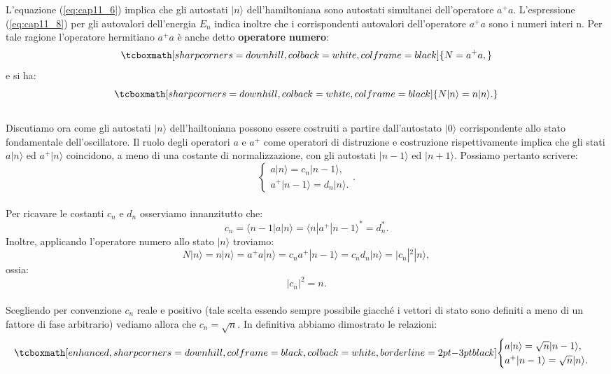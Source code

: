  L'equazione (\ref{eq:cap11_6}) implica che gli autostati $|n\rangle$ dell'hamiltoniana sono autostati simultanei dell'operatore $a^+a$. L'espressione (\ref{eq:cap11_8}) per gli autovalori dell'energia $E_n$ indica inoltre che i corrispondenti autovalori dell'operatore $a^+a$ sono i numeri interi n. Per tale ragione l'operatore hermitiano $a^+a$ è anche detto \textbf{operatore numero}:
	\begin{equation}
		\tcboxmath[sharp corners=downhill, colback=white, colframe=black]{
			N=a^+a,
			}
	\end{equation}
e si ha:
	\begin{equation}
		\tcboxmath[sharp corners=downhill, colback=white, colframe=black]{
			N|n\rangle=n|n\rangle .
			}
	\end{equation}\\
	
 Discutiamo ora come gli autostati $|n\rangle$ dell'hailtoniana possono essere costruiti a partire dall'autostato $|0\rangle$ corrispondente allo stato fondamentale dell'oscillatore.  Il ruolo degli operatori $a$ e $a^+$ come operatori di distruzione e costruzione rispettivamente implica che gli stati $a|n\rangle$ ed $a^+|n\rangle$ coincidono, a meno di una costante di normalizzazione, con gli autostati $|n-1\rangle$ ed $|n+1\rangle$. Possiamo pertanto scrivere:
	\begin{equation}
		\begin{cases}
			a|n\rangle=c_n|n-1\rangle,\\
			a^+|n-1\rangle=d_n|n\rangle.
		\end{cases}.
	\end{equation}\\

 Per ricavare le costanti $c_n$ e $d_n$ osserviamo innanzitutto che:
	\begin{equation}
		c_n=\langle n-1|a|n\rangle=\langle n|a^+|n-1\rangle^*=d_n^*.
	\end{equation}
 Inoltre, applicando l'operatore numero allo stato $|n\rangle$ troviamo:
	\begin{equation}
		N|n\rangle=n|n\rangle=a^+a|n\rangle=c_na^+|n-1\rangle=c_nd_n|n\rangle=|c_n|^2|n\rangle,
	\end{equation}
ossia:
	\begin{equation}
		|c_n|^2=n.
	\end{equation}\\
	
Scegliendo per convenzione $c_n$ reale e positivo (tale scelta essendo sempre possibile giacché i vettori di stato sono definiti a meno di un fattore di fase arbitrario) vediamo allora che $c_n=\sqrt{n}$. In definitiva abbiamo dimostrato le relazioni:
	\begin{equation}
	\label{eq:cap11_9}
		\tcboxmath[enhanced, sharp corners=downhill, colframe=black, colback=white, borderline={2pt}{-3pt}{black}]{
		\begin{cases}
			a|n\rangle= \sqrt{n} |n-1\rangle, \\
			a^+|n-1\rangle=\sqrt{n}|n\rangle.
			\end{cases}
			}
	\end{equation}\\
	
